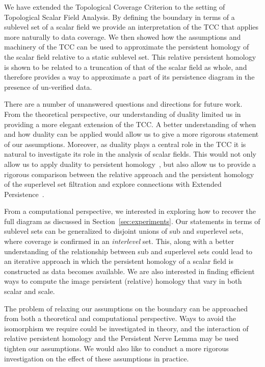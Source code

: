 
We have extended the Topological Coverage Criterion to the setting of Topological Scalar Field Analysis.
By defining the boundary in terms of a sublevel set of a scalar field we provide an interpretation of the TCC that applies more naturally to data coverage.
We then showed how the assumptions and machinery of the TCC can be used to approximate the persistent homology of the scalar field relative to a static sublevel set.
This relative persistent homology is shown to be related to a truncation of that of the scalar field as whole, and therefore provides a way to approximate a part of its persistence diagram in the presence of un-verified data.

There are a number of unanswered questions and directions for future work.
From the theoretical perspective, our understanding of duality limited us in providing a more elegant extension of the TCC.
A better understanding of when and how duality can be applied would allow us to give a more rigorous statement of our assumptions.
Moreover, as duality plays a central role in the TCC it is natural to investigate its role in the analysis of scalar fields.
This would not only allow us to apply duality to persistent homology~\cite{desilva11duality}, but also allow us to provide a rigorous comparison between the relative approach and the persistent homology of the superlevel set filtration and explore connections with Extended Persistence~\cite{cohen09extending}.

From a computational perspective, we interested in exploring how to recover the full diagram as discussed in Section~\ref{sec:experiments}.
Our statements in terms of sublevel sets can be generalized to disjoint unions of sub and superlevel sets, where coverage is confirmed in an \emph{interlevel} set.
This, along with a better understanding of the relationship between sub and superlevel sets could lead to an iterative approach in which the persistent homology of a scalar field is constructed as data becomes available.
We are also interested in finding efficient ways to compute the image persistent (relative) homology that vary in both scalar and scale.

The problem of relaxing our assumptions on the boundary can be approached from both a theoretical and computational perspective.
Ways to avoid the isomorphism we require could be investigated in theory, and the interaction of relative persistent homology and the Persistent Nerve Lemma may be used tighten our assumptions.
We would also like to conduct a more rigorous investigation on the effect of these assumptions in practice.
